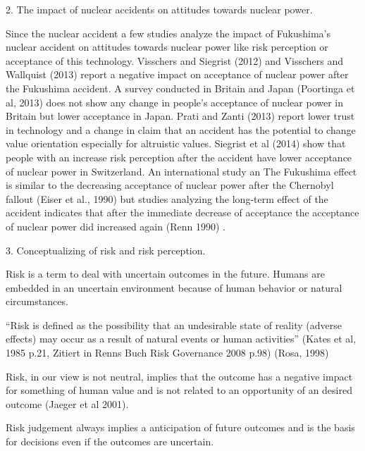 
2. The impact of nuclear accidents on attitudes towards nuclear power.

Since the nuclear accident a few studies analyze the impact of Fukushima's nuclear accident on attitudes towards nuclear power like risk perception or acceptance of this technology.  
Visschers and Siegrist (2012) and Visschers and Wallquist (2013) \citep{Visschers:2012bf,Visschers:2013ee}  report a negative impact on acceptance of nuclear power after the Fukushima accident. A survey conducted in Britain and Japan (Poortinga et al, 2013) \citep{Poortinga:2013gt} does not show any change in people's acceptance of nuclear power in Britain but lower acceptance in Japan. Prati and Zanti (2013) \citep{Prati:2013jc} report lower trust in technology and a change in claim that an accident has the potential to change value orientation especially for altruistic values.
Siegrist et al (2014) \citep{Siegrist:2014ji} show that people with an increase risk perception after the accident have lower acceptance of nuclear power in Switzerland. An international study an
The Fukushima effect is similar to the decreasing acceptance of nuclear power after the Chernobyl fallout (Eiser et al., 1990) \citep{RichardEiser:1990iw} but studies analyzing the long-term effect of the accident indicates that after the immediate decrease of acceptance the acceptance of nuclear power did increased again (Renn 1990) \citep{Renn:1990kf}.  


3. Conceptualizing of risk and risk perception.

                                                       
 


Risk is a term to deal with uncertain outcomes in the future.  Humans are embedded in an uncertain environment because of human behavior or natural circumstances.   

``Risk is defined as the possibility that an undesirable state of reality (adverse effects) may occur as a result of natural events or human activities'' (Kates et al, 1985 p.21, Zitiert in Renns Buch Risk Governance 2008 p.98) (Rosa, 1998)

Risk, in our view is not neutral, implies that the outcome has a negative impact for something of human value and is not related to an opportunity of an desired outcome (Jaeger et al 2001).

Risk judgement always implies a anticipation of future outcomes and is the basis for decisions even if the outcomes are uncertain.  


